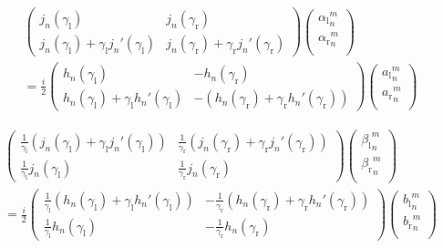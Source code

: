 \begin{multline*}
  \begin{pmatrix}
    j_n(\gamma_\text{l}) & j_n(\gamma_\text{r}) \\
  j_n(\gamma_\text{l}) + \gamma_\text{l} j_n'(\gamma_\text{l}) & j_n(\gamma_\text{r}) + \gamma_\text{r} j_n'(\gamma_\text{r})
  \end{pmatrix}
  \begin{pmatrix}
   {\alpha_\text{l}}_n^m \\
   {\alpha_\text{r}}_n^m \\
 \end{pmatrix} \\ = \frac{i}{2}
  \begin{pmatrix}
  h_n(\gamma_\text{l}) & -h_n(\gamma_\text{r}) \\
  h_n(\gamma_\text{l}) + \gamma_\text{l} h_n'(\gamma_\text{l}) & -\left(h_n(\gamma_\text{r}) + \gamma_\text{r} h_n'(\gamma_\text{r})\right)
  \end{pmatrix}
  \begin{pmatrix}
   {a_\text{l}}_n^m \\
   {a_\text{r}}_n^m \\
  \end{pmatrix}
\end{multline*}

\begin{multline*}
  \begin{pmatrix}
    \frac{1}{\gamma_\text{l}} \left(j_n(\gamma_\text{l}) + \gamma_\text{l} j_n'(\gamma_\text{l})\right) & \frac{1}{\gamma_\text{r}} \left(j_n(\gamma_\text{r}) + \gamma_\text{r} j_n'(\gamma_\text{r})\right) \\
    \frac{1}{\gamma_\text{l}} j_n(\gamma_\text{l}) & \frac{1}{\gamma_\text{r}} j_n(\gamma_\text{r}) 
  \end{pmatrix}
  \begin{pmatrix}
   {\beta_\text{l}}_n^m \\
   {\beta_\text{r}}_n^m \\
 \end{pmatrix} \\ = \frac{i}{2}
  \begin{pmatrix}
    \frac{1}{\gamma_\text{l}} \left(h_n(\gamma_\text{l}) + \gamma_\text{l} h_n'(\gamma_\text{l})\right) & -\frac{1}{\gamma_\text{r}} \left(h_n(\gamma_\text{r}) + \gamma_\text{r} h_n'(\gamma_\text{r})\right) \\
  \frac{1}{\gamma_\text{l}} h_n(\gamma_\text{l}) & -\frac{1}{\gamma_\text{r}} h_n(\gamma_\text{r}) 
  \end{pmatrix}
  \begin{pmatrix}
   {b_\text{l}}_n^m \\
   {b_\text{r}}_n^m \\
  \end{pmatrix} 
\end{multline*}

